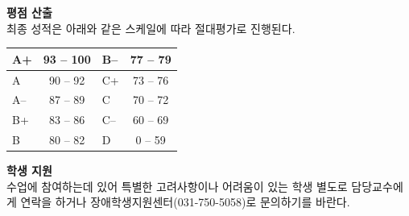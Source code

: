 \documentclass[11pt,letterpaper]{article}
\newcommand{\lefthead}[2]{\noindent\textbf{#1}\hfill\\[#2]}
\begin{document}
\lefthead{평점 산출}{0.3cm}
\noindent 최종 성적은 아래와 같은 스케일에 따라 절대평가로 진행된다. \\
        \begin{center}
        \begin{tabular}{|l||c|l||c|} \hline
        A+ & 93 -- 100 & B-- & 77 -- 79 \\ \hline
        A & 90 -- 92 & C+ & 73 -- 76 \\ \hline
        A-- & 87 -- 89 & C & 70 -- 72 \\ \hline
        B+ & 83 -- 86 & C-- & 60 -- 69 \\ \hline
        B & 80 -- 82 & D & 0 -- 59 \\
		 \hline
        \end{tabular}
        \end{center} \vspace{0.3cm}



\lefthead{학생 지원}{0.3cm}
\noindent 수업에 참여하는데 있어 특별한 고려사항이나 어려움이 있는 학생 별도로 담당교수에게 연락을 하거나 장애학생지원센터(031-750-5058)로 문의하기를 바란다. \\








\end{document}
